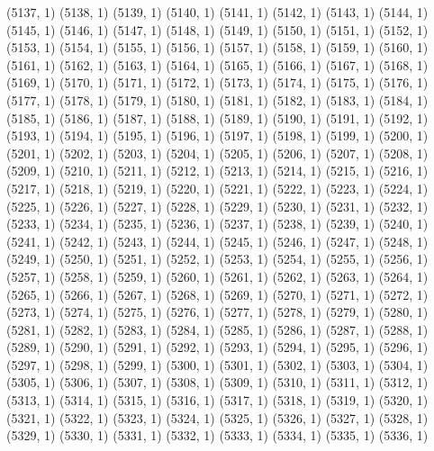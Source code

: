 {   (5137, 1)
   (5138, 1)
   (5139, 1)
   (5140, 1)
   (5141, 1)
   (5142, 1)
   (5143, 1)
   (5144, 1)
   (5145, 1)
   (5146, 1)
   (5147, 1)
   (5148, 1)
   (5149, 1)
   (5150, 1)
   (5151, 1)
   (5152, 1)
   (5153, 1)
   (5154, 1)
   (5155, 1)
   (5156, 1)
   (5157, 1)
   (5158, 1)
   (5159, 1)
   (5160, 1)
   (5161, 1)
   (5162, 1)
   (5163, 1)
   (5164, 1)
   (5165, 1)
   (5166, 1)
   (5167, 1)
   (5168, 1)
   (5169, 1)
   (5170, 1)
   (5171, 1)
   (5172, 1)
   (5173, 1)
   (5174, 1)
   (5175, 1)
   (5176, 1)
   (5177, 1)
   (5178, 1)
   (5179, 1)
   (5180, 1)
   (5181, 1)
   (5182, 1)
   (5183, 1)
   (5184, 1)
   (5185, 1)
   (5186, 1)
   (5187, 1)
   (5188, 1)
   (5189, 1)
   (5190, 1)
   (5191, 1)
   (5192, 1)
   (5193, 1)
   (5194, 1)
   (5195, 1)
   (5196, 1)
   (5197, 1)
   (5198, 1)
   (5199, 1)
   (5200, 1)
   (5201, 1)
   (5202, 1)
   (5203, 1)
   (5204, 1)
   (5205, 1)
   (5206, 1)
   (5207, 1)
   (5208, 1)
   (5209, 1)
   (5210, 1)
   (5211, 1)
   (5212, 1)
   (5213, 1)
   (5214, 1)
   (5215, 1)
   (5216, 1)
   (5217, 1)
   (5218, 1)
   (5219, 1)
   (5220, 1)
   (5221, 1)
   (5222, 1)
   (5223, 1)
   (5224, 1)
   (5225, 1)
   (5226, 1)
   (5227, 1)
   (5228, 1)
   (5229, 1)
   (5230, 1)
   (5231, 1)
   (5232, 1)
   (5233, 1)
   (5234, 1)
   (5235, 1)
   (5236, 1)
   (5237, 1)
   (5238, 1)
   (5239, 1)
   (5240, 1)
   (5241, 1)
   (5242, 1)
   (5243, 1)
   (5244, 1)
   (5245, 1)
   (5246, 1)
   (5247, 1)
   (5248, 1)
   (5249, 1)
   (5250, 1)
   (5251, 1)
   (5252, 1)
   (5253, 1)
   (5254, 1)
   (5255, 1)
   (5256, 1)
   (5257, 1)
   (5258, 1)
   (5259, 1)
   (5260, 1)
   (5261, 1)
   (5262, 1)
   (5263, 1)
   (5264, 1)
   (5265, 1)
   (5266, 1)
   (5267, 1)
   (5268, 1)
   (5269, 1)
   (5270, 1)
   (5271, 1)
   (5272, 1)
   (5273, 1)
   (5274, 1)
   (5275, 1)
   (5276, 1)
   (5277, 1)
   (5278, 1)
   (5279, 1)
   (5280, 1)
   (5281, 1)
   (5282, 1)
   (5283, 1)
   (5284, 1)
   (5285, 1)
   (5286, 1)
   (5287, 1)
   (5288, 1)
   (5289, 1)
   (5290, 1)
   (5291, 1)
   (5292, 1)
   (5293, 1)
   (5294, 1)
   (5295, 1)
   (5296, 1)
   (5297, 1)
   (5298, 1)
   (5299, 1)
   (5300, 1)
   (5301, 1)
   (5302, 1)
   (5303, 1)
   (5304, 1)
   (5305, 1)
   (5306, 1)
   (5307, 1)
   (5308, 1)
   (5309, 1)
   (5310, 1)
   (5311, 1)
   (5312, 1)
   (5313, 1)
   (5314, 1)
   (5315, 1)
   (5316, 1)
   (5317, 1)
   (5318, 1)
   (5319, 1)
   (5320, 1)
   (5321, 1)
   (5322, 1)
   (5323, 1)
   (5324, 1)
   (5325, 1)
   (5326, 1)
   (5327, 1)
   (5328, 1)
   (5329, 1)
   (5330, 1)
   (5331, 1)
   (5332, 1)
   (5333, 1)
   (5334, 1)
   (5335, 1)
   (5336, 1)
}
